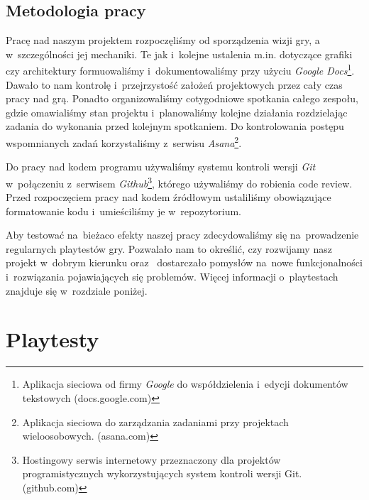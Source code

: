 \documentclass[licencjacka]{pracamgr}
\begin{document}
  \section{Metodologia pracy}
    Pracę nad naszym projektem rozpoczęliśmy od sporządzenia wizji gry, a w~szczególności jej mechaniki. Te jak i~kolejne
    ustalenia m.in. dotyczące grafiki czy architektury formuowaliśmy i~dokumentowaliśmy przy użyciu \emph{Google Docs}\footnote{Aplikacja 
    sieciowa od firmy \emph{Google} do współdzielenia i~edycji dokumentów tekstowych (docs.google.com)}. Dawało to nam kontrolę i~przejrzystość
    założeń projektowych przez cały czas pracy nad grą. Ponadto organizowaliśmy cotygodniowe spotkania całego zespołu, gdzie omawialiśmy stan projektu
    i~planowaliśmy kolejne działania rozdzielając zadania do wykonania przed kolejnym spotkaniem. Do kontrolowania postępu wspomnianych zadań korzystaliśmy
    z~serwisu \emph{Asana}\footnote{Aplikacja sieciowa do zarządzania zadaniami przy projektach wieloosobowych. (asana.com)}.

    Do pracy nad kodem programu używaliśmy systemu kontroli wersji \emph{Git} w~połączeniu z~serwisem \emph{Github}\footnote{Hostingowy
    serwis internetowy przeznaczony dla projektów programistycznych wykorzystujących system kontroli wersji Git. (github.com)}, którego używaliśmy
    do robienia code review. Przed rozpoczęciem pracy nad kodem źródłowym ustaliliśmy obowiązujące formatowanie kodu i~umieściliśmy je w~repozytorium.

    Aby testować na~bieżaco efekty naszej pracy zdecydowaliśmy się na~prowadzenie regularnych playtestów gry. Pozwalało nam to określić,
    czy rozwijamy nasz projekt w~dobrym kierunku oraz~ dostarczało pomysłów na~nowe funkcjonalności i~rozwiązania pojawiających się problemów.
    Więcej informacji o~playtestach znajduje się w~rozdziale poniżej.

\chapter{Playtesty}
\end{document}
